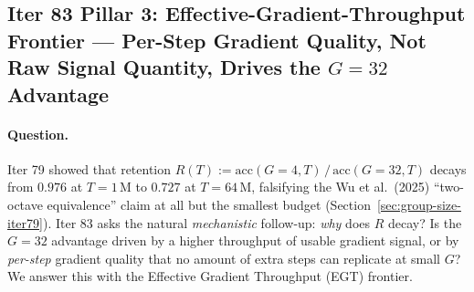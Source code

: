 \subsection{Iter 83 Pillar 3: Effective-Gradient-Throughput Frontier ---
              Per-Step Gradient Quality, Not Raw Signal Quantity,
              Drives the $G{=}32$ Advantage}
\label{sec:group-size-iter83}

\paragraph{Question.}
Iter 79 showed that retention $R(T) := \mathrm{acc}(G{=}4, T)\,/\,
\mathrm{acc}(G{=}32, T)$ decays from $0.976$ at $T{=}1\,\mathrm{M}$ to
$0.727$ at $T{=}64\,\mathrm{M}$, falsifying the Wu et al.\ (2025)
``two-octave equivalence'' claim at all but the smallest budget
(Section~\ref{sec:group-size-iter79}).  Iter 83 asks the natural
\emph{mechanistic} follow-up: \emph{why} does $R$ decay?  Is the
$G{=}32$ advantage driven by a higher throughput of usable gradient
signal, or by \emph{per-step} gradient quality that no amount of extra
steps can replicate at small $G$?  We answer this with the Effective
Gradient Throughput (EGT) frontier.

